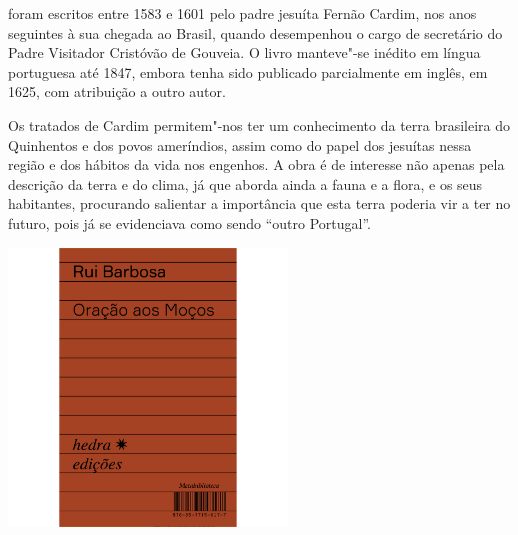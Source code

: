 \hspace*{-7cm}\hrulefill\hspace*{-7cm}

\medskip

 foram escritos entre 1583 e 1601 pelo padre jesuíta Fernão Cardim, nos anos seguintes à sua chegada ao Brasil, quando desempenhou o cargo de secretário do Padre Visitador Cristóvão de Gouveia. O livro manteve"-se inédito em língua portuguesa até 1847, embora tenha sido publicado parcialmente em inglês, em 1625, com atribuição a outro autor.

Os tratados de Cardim permitem"-nos ter um conhecimento da terra brasileira do Quinhentos e dos povos ameríndios, assim como do papel dos jesuítas nessa região e dos hábitos da vida nos engenhos. A obra é de interesse não apenas pela descrição da terra e do clima, já que aborda ainda a fauna e a flora, e os seus habitantes, procurando salientar a importância que esta terra poderia vir a ter no futuro, pois já se evidenciava como sendo “outro Portugal”. 

\vfill

\hspace*{-.4cm}\begin{minipage}[c]{.5\linewidth}
\small{
{}}
\end{minipage}

\pagebreak

\begin{center}
\hspace*{.5cm}\includegraphics[width=74mm]{./grid/barbosa.jpg}
\end{center}

